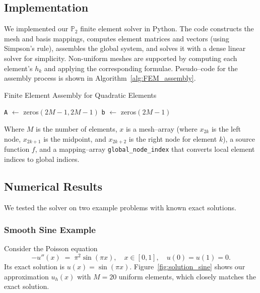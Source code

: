 \documentclass[a4paper,10pt]{article}
\begin{document}
\subsection{Implementation}
We implemented our \(\mathbb{P}_2\) finite element solver in Python. The code constructs
the mesh and basis mappings, computes element matrices and vectors (using Simpson's rule),
assembles the global system, and solves it with a dense linear solver for simplicity.
Non-uniform meshes are supported by computing each element's \(h_k\) and applying the
corresponding formulae. Pseudo--code for the assembly process is shown in Algorithm~\ref{alg:FEM_assembly}.

\begin{algorithm}[H]
	\caption{Finite Element Assembly for Quadratic Elements}
	\label{alg:FEM_assembly}
	\BlankLine
	\texttt{A} \(\leftarrow\) zeros\((2M-1, 2M-1)\)\;
	\texttt{b} \(\leftarrow\) zeros\((2M-1)\)\;
	\BlankLine
	\BlankLine
\end{algorithm}

Where $M$ is the number of elements, $x$ is a mesh--array  (where $x_{2k}$ is the left node, $x_{2k+1}$ is the midpoint, and $x_{2k+2}$ is the right node for element $k$), a source function $f$, and a mapping--array \texttt{global\_node\_index} that converts local element indices to global indices.

\subsection{Numerical Results}
We tested the solver on two example problems with known exact solutions.

\subsubsection*{Smooth Sine Example}
Consider the Poisson equation
\[
	-u''(x) \;=\; \pi^2 \sin(\pi x), \quad x \in [0,1], \quad u(0)=u(1)=0.
\]
Its exact solution is \(u(x) = \sin(\pi x)\). Figure~\ref{fig:solution_sine}
shows our approximation \(u_h(x)\) with \(M=20\) uniform elements, which closely
matches the exact solution.
\end{document}
